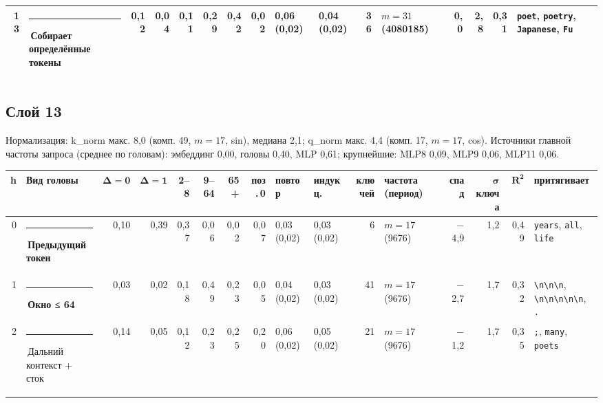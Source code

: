 \documentclass[10pt]{article}
\begin{document}
\begin{minipage}{\linewidth}
\begin{center}
{\begin{tabular}{|r|l|r|r|r|r|r|r|l|l|r|l|r|r|r|l|}
13 & \textcolor[HTML]{6250D6}{\rule{0.62em}{0.62em}}\,\textbf{Собирает определённые токены} & 0,12 & 0,04 & 0,11 & 0,29 & 0,42 & 0,02 & 0,06 (0,02) & 0,04 (0,02) & 36 & $m{=}31$ (4080185) & 0,0 & 2,8 & 0,31 & \texttt{\textvisiblespace{}poet}, \texttt{\textvisiblespace{}poetry}, \texttt{\textvisiblespace{}Japanese}, \texttt{\textvisiblespace{}Fu} \\ \hline
\hline\end{tabular}}\end{center}
\end{minipage}
\par\vspace{0.4em}
\noindent\begin{minipage}{\linewidth}
\subsection*{Слой 13}
{\small\color{ink2} Нормализация: k\_norm макс. 8,0 (комп. 49, $m{=}17$, sin), медиана 2,1; q\_norm макс. 4,4 (комп. 17, $m{=}17$, cos). Источники главной частоты запроса (среднее по головам): эмбеддинг 0,00, головы 0,40, MLP 0,61; крупнейшие: MLP8 0,09, MLP9 0,06, MLP11 0,06.}
\begin{center}{\footnotesize\begin{tabular}{|r|l|r|r|r|r|r|r|l|l|r|l|r|r|r|l|}
\hline
\rowcolor{head}\textbf{h} & \textbf{Вид головы} & $\boldsymbol{\Delta{=}0}$ & $\boldsymbol{\Delta{=}1}$ & \textbf{2–8} & \textbf{9–64} & \textbf{65+} & \textbf{поз.\,0} & \textbf{повтор} & \textbf{индукц.} & \textbf{ключей} & \textbf{частота (период)} & \textbf{спад} & $\boldsymbol{\sigma}$ \textbf{ключа} & $\boldsymbol{R^2}$ & \textbf{притягивает} \\ \hline
0 & \textcolor[HTML]{2A78D6}{\rule{0.62em}{0.62em}}\,\textbf{Предыдущий токен} & 0,10 & 0,39 & 0,37 & 0,06 & 0,02 & 0,07 & 0,03 (0,02) & 0,03 (0,02) & 6 & $m{=}17$ (9676) & $-$4,9 & 1,2 & 0,49 & \texttt{\textvisiblespace{}years}, \texttt{\textvisiblespace{}all}, \texttt{\textvisiblespace{}life} \\ \hline
1 & \textcolor[HTML]{EDA100}{\rule{0.62em}{0.62em}}\,\textbf{Окно ≤ 64} & 0,03 & 0,02 & 0,18 & 0,49 & 0,23 & 0,05 & 0,04 (0,02) & 0,03 (0,02) & 41 & $m{=}17$ (9676) & $-$2,7 & 1,7 & 0,32 & \texttt{\textvisiblespace{}\textbackslash{}n\textbackslash{}n\textbackslash{}n}, \texttt{\textbackslash{}n\textbackslash{}n\textbackslash{}n\textbackslash{}n\textbackslash{}n}, \texttt{\textvisiblespace{}.} \\ \hline
2 & \textcolor[HTML]{C3C2B7}{\rule{0.62em}{0.62em}}\,Дальний контекст + сток & 0,14 & 0,05 & 0,12 & 0,23 & 0,25 & 0,20 & 0,06 (0,02) & 0,05 (0,02) & 21 & $m{=}17$ (9676) & $-$1,2 & 1,7 & 0,35 & \texttt{\textvisiblespace{};}, \texttt{\textvisiblespace{}many}, \texttt{\textvisiblespace{}poets} \\ \hline

\end{tabular}}
\end{center}
\end{minipage}
\end{document}
